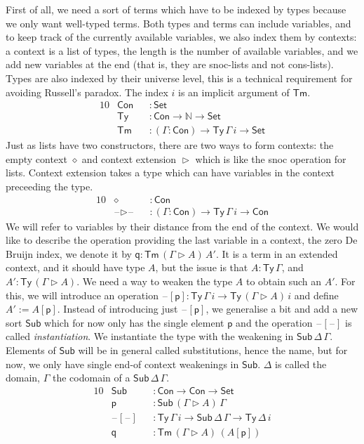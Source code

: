 \documentclass[sigplan,10pt,anonymous,review]{acmart}\settopmatter{printfolios=true,printccs=false,printacmref=false}
\newcommand{\ra}{\rightarrow}
\newcommand{\Set}{\mathsf{Set}}
\newcommand{\Ty}{\mathsf{Ty}}
\newcommand{\Tm}{\mathsf{Tm}}
\newcommand{\Con}{\mathsf{Con}}
\newcommand{\Sub}{\mathsf{Sub}}
\newcommand{\p}{\mathsf{p}}
\newcommand{\q}{\mathsf{q}}
\newcommand{\ext}{\mathop{\triangleright}}
\newcommand{\N}{\mathbb{N}}
\newcommand{\blank}{\mathord{\hspace{1pt}\text{--}\hspace{1pt}}} %
\begin{document}
First of all, we need a sort of terms which have to be indexed by
types because we only want well-typed terms. Both types and terms can
include variables, and to keep track of the currently available
variables, we also index them by contexts: a context is a list of
types, the length is the number of available variables, and we add new
variables at the end (that is, they are snoc-lists and not
cons-lists). Types are also indexed by their universe level, this is a
technical requirement for avoiding Russell's paradox. The index $i$ is
an implicit argument of $\Tm$.
\begin{alignat*}{10}
& \Con && : \Set \\
& \Ty && : \Con\ra\N\ra\Set \\
& \Tm && : (\Gamma:\Con)\ra\Ty\,\Gamma\,i\ra\Set
\end{alignat*}
Just as lists have two constructors, there are two ways to form
contexts: the empty context $\diamond$ and context extension $\ext$
which is like the snoc operation for lists. Context extension takes a
type which can have variables in the context preceeding the type.
\begin{alignat*}{10}
& \diamond && : \Con \\
& \blank\ext\blank && : (\Gamma:\Con)\ra\Ty\,\Gamma\,i\ra\Con
\end{alignat*}
We will refer to variables by their distance from the end of the
context. We would like to describe the operation providing the last
variable in a context, the zero De Bruijn index, we denote it by $\q :
\Tm\,(\Gamma\ext A)\,A'$. It is a term in an extended context, and it
should have type $A$, but the issue is that $A : \Ty\,\Gamma$, and $A'
: \Ty\,(\Gamma\ext A)$. We need a way to weaken the type $A$ to obtain
such an $A'$. For this, we will introduce an operation $\blank[\p] :
\Ty\,\Gamma\,i\ra\Ty\,(\Gamma\ext A)\,i$ and define $A' := A[\p]$. Instead
of introducing just $\blank[\p]$, we generalise a bit and add a new
sort $\Sub$ which for now only has the single element $\p$ and the
operation $\blank[\blank]$ is called \emph{instantiation}. We
instantiate the type with the weakening in
$\Sub\,\Delta\,\Gamma$. Elements of $\Sub$ will be in general called
substitutions, hence the name, but for now, we only have single end-of
context weakenings in $\Sub$. $\Delta$ is called the domain, $\Gamma$
the codomain of a $\Sub\,\Delta\,\Gamma$.
\begin{alignat*}{10}
& \Sub && : \Con\ra\Con\ra\Set \\
& \p && : \Sub\,(\Gamma\ext A)\,\Gamma \\
& \blank[\blank] && : \Ty\,\Gamma\,i\ra\Sub\,\Delta\,\Gamma\ra\Ty\,\Delta\,i \\
& \q && : \Tm\,(\Gamma\ext A)\,(A[\p])
\end{alignat*}
\end{document}
